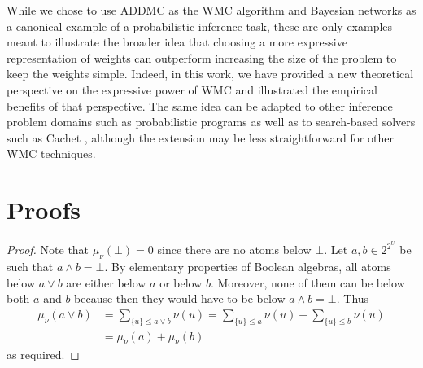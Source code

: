 \documentclass{article}
\begin{document}
While we chose to use ADDMC \cite{DBLP:conf/aaai/DudekPV20} as the WMC algorithm
and Bayesian networks as a canonical example of a probabilistic inference task,
these are only examples meant to illustrate the broader idea that choosing a
more expressive representation of weights can outperform increasing the size of
the problem to keep the weights simple. Indeed, in this work, we have provided a
new theoretical perspective on the expressive power of WMC and illustrated the
empirical benefits of that perspective. The same idea can be adapted to other
inference problem domains such as probabilistic programs
\cite{DBLP:journals/tplp/FierensBRSGTJR15,DBLP:journals/corr/abs-2005-09089} as
well as to search-based solvers such as Cachet \cite{DBLP:conf/sat/SangBBKP04},
although the extension may be less straightforward for other WMC techniques.




\appendix
\section{Proofs}

\measure*
\begin{proof}
  Note that $\mu_\nu(\bot) = 0$ since there are no atoms below $\bot$. Let $a, b
  \in 2^{2^{U}}$ be such that $a \land b = \bot$. By elementary properties of
  Boolean algebras, all atoms below $a \lor b$ are either below $a$ or below
  $b$. Moreover, none of them can be below both $a$ and $b$ because then they
  would have to be below $a \land b = \bot$. Thus
  \begin{align*}
    \mu_\nu(a \lor b) &= \sum_{\{u\} \le a \lor b} \nu(u) = \sum_{\{u\} \le a} \nu(u) + \sum_{\{u\} \le b} \nu(u) \\
                      &= \mu_\nu(a) + \mu_\nu(b)
  \end{align*}
  as required.
\end{proof}
\end{document}
